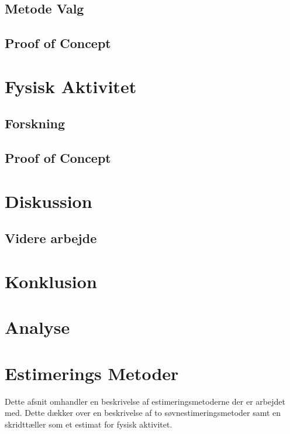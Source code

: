 \section{Metode Valg}

\section{Proof of Concept}


\chapter{Fysisk Aktivitet}

\section{Forskning}

\section{Proof of Concept}


\chapter{Diskussion}
\section{Videre arbejde}

\chapter{Konklusion}


\iffalse

\chapter{Analyse}




\chapter{Estimerings Metoder}
Dette afsnit omhandler en beskrivelse af estimeringsmetoderne der er arbejdet med.
Dette dækker over en beskrivelse af to søvnestimeringsmetoder samt en skridttæller som et estimat for fysisk aktivitet.
